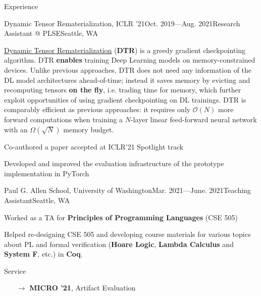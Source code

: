 \documentclass{cv}
\newcommand{\myul}[2][blue]{\setulcolor{#1}\ul{#2}\setulcolor{blue}}
\begin{document}
\begin{rSection}{Experience}
        \begin{rSubsection}{Dynamic Tensor Rematerialization, ICLR '21}{Oct. 2019---Aug. 2021}{Research Assistant @ PLSE}{Seattle, WA}
            \item \href{https://github.com/uwsampl/dtr-prototype}{\color{blue} \myul{Dynamic Tensor Rematerialization}} (\textbf{DTR}) is a greedy gradient checkpointing algorithm. DTR \textbf{enables} training Deep Learning models on memory-constrained devices. Unlike previous approaches, DTR does not need any information of the DL model architectures ahead-of-time; instead it saves memory by evicting and recomputing tensors \textbf{on the fly}, i.e. trading time for memory, which further exploit opportunities of using gradient checkpointing on DL trainings. DTR is comparably efficient as previous approaches: it requires only $\mathcal{O}(N)$ more forward computations when training a $N$-layer linear feed-forward neural network with an $\Omega(\sqrt{N})$ memory budget.
            \item Co-authored a paper accepted at ICLR'21 Spotlight track
			\item Developed and improved the evaluation infrastructure of the prototype implementation in PyTorch
        \end{rSubsection}

		\begin{rSubsection}{Paul G. Allen School, University of Washington}{Mar. 2021---June. 2021}{Teaching Assistant}{Seattle, WA}
			\item Worked as a TA for \textbf{Principles of Programming Languages} (CSE 505)
			\item Helped re-designing CSE 505 and developing course materials for various topics about PL and formal verification (\textbf{Hoare Logic}, \textbf{Lambda Calculus} and \textbf{System F}, etc.) in \textbf{Coq}.
		\end{rSubsection}
    \end{rSection}

	\begin{rSection}{Service}
    	\begin{enumerate}
    		\setlength{\itemsep}{1pt}
            \setlength{\parskip}{0pt}
    		\setlength{\parsep}{0pt}
    		\item[$\rightarrow$] \textbf{MICRO '21}, Artifact Evaluation
    	\end{enumerate}
	\end{rSection}
\end{document}

